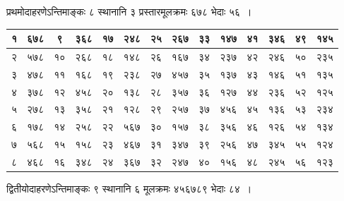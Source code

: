 \documentclass[11pt, openany]{book}
\begin{document}
प्रथमोदाहरणेऽन्तिमाङ्कः ८ स्थानानि ३ प्रस्तारमूलक्रमः ६७८ भेदाः ५६~।

\begin{table}[h]
	\setlength{\extrarowheight}{2pt} \setlength{\tabcolsep}{2pt}
\centering	
\begin{tabular}{|c|c|c|c|c|c|c|c|c|c|c|c|c|c|}
	\hline
१  &  ६७८ & ९  & ३६८  & १७ & २४८ & २५ & २६७ & ३३ & १४७  & ४१ & ३४६ &४९ & १४५\\
\hline
२ & ५७८ & १० & २६८ & १८ & १४८ & २६ & १६७ & ३४ & २३७ & ४२ & २४६ & ५० & २३५\\
\hline
 ३ & ४७८ & ११ & १६८ & १९ & २३८ & २७ & ४५७ & ३५ & १३७ &   ४३ & १४६  & ५१ & १३५\\
 \hline
४ & ३७८ & १२ & ४५८ & २० & १३८ & २८ & ३५७ & ३६ & १२७ & ४४ & २३६ & ५२ & १२५ \\
\hline
५ & २७८ & १३  & ३५८ & २१ & १२८ & २९ & २५७ & ३७ & ४५६ & ४५ & १३६ & ५३ & २३४\\
\hline
६ & १७८ & १४ & २५८ & २२ & ५६७ & ३० & १५७ & ३८ & ३५६ & ४६ & १२६ & ५४ & १३४ \\
\hline 
७ & ५६८ & १५ & १५८ & २३ & ४६७ & ३१ & ३४७ & ३९ & २५६ & ४७ & ३४५ & ५५ & १२४\\
\hline
 ८ & ४६८ & १६ & ३४८ & २४ & ३६७ & ३२ & २४७ & ४० & १५६ & ४८ & २४५ & ५६ & १२३\\
 \hline
\end{tabular}
	\end{table}

द्वितीयोदाहरणेऽन्तिमाङ्कः ९ स्थानानि ६ मूलक्रमः ४५६७८९ भेदाः ८४~।
\end{document}
